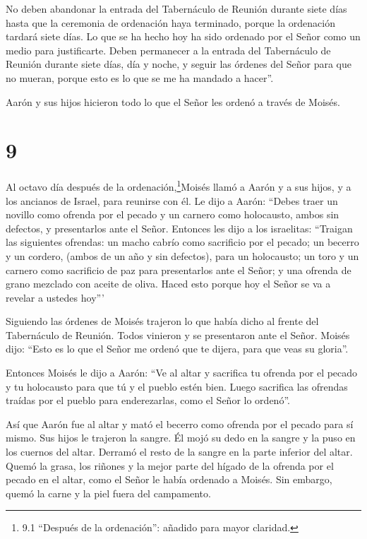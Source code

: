  No deben abandonar la entrada del Tabernáculo de Reunión
durante siete días hasta que la ceremonia de ordenación haya terminado,
porque la ordenación tardará siete días.  Lo que se ha
hecho hoy ha sido ordenado por el Señor como un medio para justificarte.
 Deben permanecer a la entrada del Tabernáculo de Reunión
durante siete días, día y noche, y seguir las órdenes del Señor para que
no mueran, porque esto es lo que se me ha mandado a hacer''.

 Aarón y sus hijos hicieron todo lo que el Señor les ordenó
a través de Moisés.

\hypertarget{section-8}{%
\section{9}\label{section-8}}

 Al octavo día después de la ordenación,\footnote{9.1
  ``Después de la ordenación'': añadido para mayor claridad.}Moisés
llamó a Aarón y a sus hijos, y a los ancianos de Israel, para reunirse
con él.  Le dijo a Aarón: ``Debes traer un novillo como
ofrenda por el pecado y un carnero como holocausto, ambos sin defectos,
y presentarlos ante el Señor.  Entonces les dijo a los
israelitas: ``Traigan las siguientes ofrendas: un macho cabrío como
sacrificio por el pecado; un becerro y un cordero, (ambos de un año y
sin defectos), para un holocausto;  un toro y un carnero
como sacrificio de paz para presentarlos ante el Señor; y una ofrenda de
grano mezclado con aceite de oliva. Haced esto porque hoy el Señor se va
a revelar a ustedes hoy'''

 Siguiendo las órdenes de Moisés trajeron lo que había dicho
al frente del Tabernáculo de Reunión. Todos vinieron y se presentaron
ante el Señor.  Moisés dijo: ``Esto es lo que el Señor me
ordenó que te dijera, para que veas su gloria''.

 Entonces Moisés le dijo a Aarón: ``Ve al altar y sacrifica
tu ofrenda por el pecado y tu holocausto para que tú y el pueblo estén
bien. Luego sacrifica las ofrendas traídas por el pueblo para
enderezarlas, como el Señor lo ordenó''.

 Así que Aarón fue al altar y mató el becerro como ofrenda
por el pecado para sí mismo.  Sus hijos le trajeron la
sangre. Él mojó su dedo en la sangre y la puso en los cuernos del altar.
Derramó el resto de la sangre en la parte inferior del altar.
 Quemó la grasa, los riñones y la mejor parte del hígado de
la ofrenda por el pecado en el altar, como el Señor le había ordenado a
Moisés.  Sin embargo, quemó la carne y la piel fuera del
campamento.

